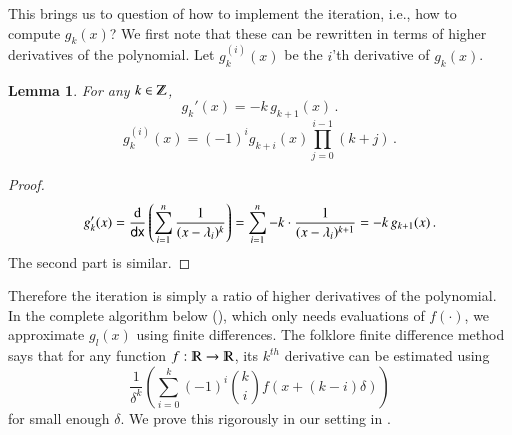 \documentclass{article}[12pt]
\newtheorem{lemma}[theorem]{Lemma}
\theoremstyle{definition}
\renewcommand{\mathbb}{\varmathbb}
\newcommand{\mper}{\,.}
\newcommand{\paren}[1]{\left(#1 \right )}
\newcommand{\Z}{{\mathbb Z}}
\newcommand{\R}{\mathbb R}
\newcommand{\charp}{f}
\newcommand{\mom}{g}
\newcommand*\diff{\mathop{}\!\mathrm{d}}
\newcommand{\dx}{{\sf dx}}
\begin{document}
This brings us to question of how to implement the iteration, i.e., how to 
compute $\mom_k(x)$? We first note that these can be rewritten in terms of higher
 derivatives of the polynomial. Let $\mom_k^{(i)}(x)$ be the $i$'th derivative of $\mom_k(x)$.
\begin{lemma}
\label{lem:momprime}
For any $k \in \Z$,
\[ \mom_k'(x) = - k\, \mom_{k+1}(x)  \mper  \]
\[ \mom_k^{(i)}(x) = (-1)^i \mom_{k+i}(x) \prod_{j=0}^{i-1} (k+j) \mper \] 
\end{lemma}

\begin{proof}
\[ \mom_k'(x) = \frac{\diff}{\dx} \paren{  \sum_{i=1}^n \frac{1}{ (x-\lambda_i)^k }} = 
\sum_{i=1}^n   -k \cdot \frac{1}{ (x-\lambda_i)^{k+1} }  = -k\, \mom_{k+1} (x) \mper  \]
The second part is similar.
\end{proof}

Therefore the iteration  is simply a ratio of higher derivatives of the polynomial. 
In the complete algorithm below (), which only needs evaluations of $\charp(\cdot)$, 
we approximate $\mom_l(x)$ using finite differences. The folklore finite difference method says that for any
function $f: \R \to \R$, its $k^{th}$ derivative can be estimated using  
\[ \frac{1}{\delta^{k}} \paren{ \sum_{i = 0}^{k} (-1)^i \binom{k}{i}  f \paren{x + (k-i)\delta }}  \]
for small enough $\delta$.
We prove this rigorously in our setting in .
\end{document}
